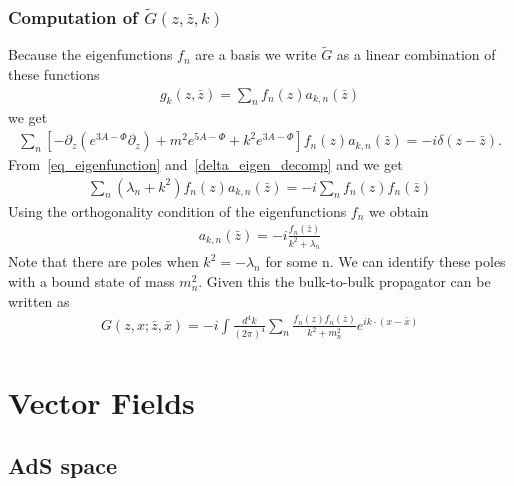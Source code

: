 \documentclass[12pt,a4paper]{article}
\begin{document}
\subsubsection{Computation of $\tilde{G}\left(z,\bar{z},k\right)$}

Because the eigenfunctions $f_n$ are a basis we write $\tilde{G}$ as a linear combination of these functions
\begin{align}
    g_k\left(z,\bar{z}\right) = \sum_n f_n\left(z\right) a_{k,n} \left(\bar{z}\right)
\end{align}
we get
\begin{align}
    \sum_n\left[- \partial_z \left( e^{3 A - \Phi} \partial_z \right) + m^2 e^{5 A - \Phi} + k^2 e^{3 A - \Phi} \right] f_n\left(z\right) a_{k,n} \left(\bar{z}\right) = - i \delta \left( z -\bar{z} \right).
 \end{align}
From~\ref{eq_eigenfunction} and~\ref{delta_eigen_decomp} and  we get
\begin{align}
    \sum_n \left(\lambda_n + k^2 \right) f_n\left(z\right) a_{k,n} \left(\bar{z}\right) = - i \sum_n f_n \left(z \right) f_n \left(\bar{z}\right)
 \end{align}
Using the orthogonality condition of the eigenfunctions $f_n$ we obtain
\begin{align}
    a_{k,n}\left(\bar{z}\right) = -i \frac{f_n\left(\bar{z}\right)}{k^2 + \lambda_n }
\end{align}
Note that there are poles when $k^2 = - \lambda_n$ for some n. We can identify these poles with a bound state of mass $m_n^2$. Given this the bulk-to-bulk propagator can be written as
\begin{align}
    G \left(z, x ; \bar{z}, \bar{x} \right) = - i \int \frac{d^4 k}{{\left(2 \pi \right)}^4} \sum_n \frac{f_n \left(z\right)f_n \left(\bar{z}\right)}{k^2 + m_n ^2 } e^{i k \cdot \left( x - \bar{x} \right)}
\end{align}
\section{Vector Fields}

\subsection{AdS space}
\end{document}
